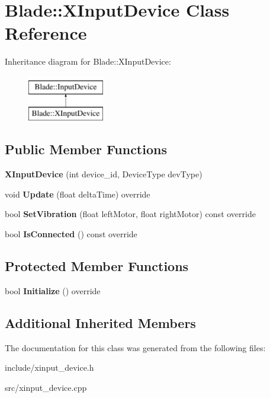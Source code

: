 \hypertarget{class_blade_1_1_x_input_device}{}\section{Blade\+:\+:X\+Input\+Device Class Reference}
\label{class_blade_1_1_x_input_device}
Inheritance diagram for Blade\+:\+:X\+Input\+Device\+:\begin{figure}[H]
\begin{center}
\leavevmode
\includegraphics[height=2.000000cm]{class_blade_1_1_x_input_device}
\end{center}
\end{figure}
\subsection*{Public Member Functions}
\begin{DoxyCompactItemize}
\item 
\mbox{\label{class_blade_1_1_x_input_device_a6867d41263a24e24767fe7cb02930b0d}} 
{\bfseries X\+Input\+Device} (int device\+\_\+id, Device\+Type dev\+Type)
\item 
\mbox{\label{class_blade_1_1_x_input_device_a32a94ba12dd032a93a56b766073c7159}} 
void {\bfseries Update} (float delta\+Time) override
\item 
\mbox{\label{class_blade_1_1_x_input_device_a9119d7193d51c1003ee6bb8074518ef4}} 
bool {\bfseries Set\+Vibration} (float left\+Motor, float right\+Motor) const override
\item 
\mbox{\label{class_blade_1_1_x_input_device_a4eb3b23fabf556140c0ab14dd44a7009}} 
bool {\bfseries Is\+Connected} () const override
\end{DoxyCompactItemize}
\subsection*{Protected Member Functions}
\begin{DoxyCompactItemize}
\item 
\mbox{\label{class_blade_1_1_x_input_device_af446c4579260d23b0af0a7f4bdfda441}} 
bool {\bfseries Initialize} () override
\end{DoxyCompactItemize}
\subsection*{Additional Inherited Members}


The documentation for this class was generated from the following files\+:\begin{DoxyCompactItemize}
\item 
include/xinput\+\_\+device.\+h\item 
src/xinput\+\_\+device.\+cpp\end{DoxyCompactItemize}
